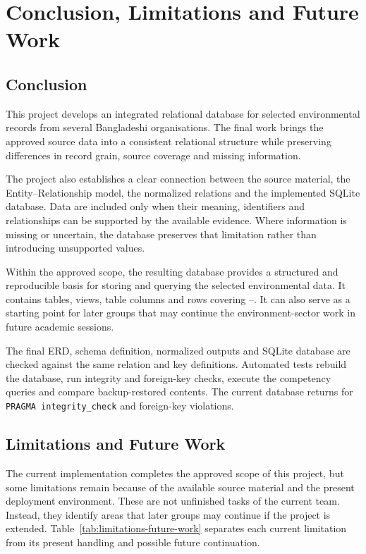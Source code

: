 \section{Conclusion, Limitations and Future Work}
\label{sec:cfw}

\subsection{Conclusion}

This project develops an integrated relational database for selected
environmental records from several Bangladeshi organisations. The final work
brings the approved source data into a consistent relational structure while
preserving differences in record grain, source coverage and missing
information.

The project also establishes a clear connection between the source material,
the Entity--Relationship model, the normalized relations and the implemented
SQLite database. Data are included only when their meaning, identifiers and
relationships can be supported by the available evidence. Where information
is missing or uncertain, the database preserves that limitation rather than
introducing unsupported values.

Within the approved scope, the resulting database provides a structured and
reproducible basis for storing and querying the selected environmental data.
It contains \mDbTables{} tables, \mDbViews{} views, \mDbColumns{} table columns
and \mDbRows{} rows covering \mYearMin--\mYearMax. It can also serve as a
starting point for later groups that may continue the environment-sector work
in future academic sessions.

The final ERD, schema definition, normalized outputs and SQLite database are
checked against the same relation and key definitions. Automated tests rebuild
the database, run integrity and foreign-key checks, execute the competency
queries and compare backup-restored contents. The current database returns
\texttt{\mDbIntegrity} for \texttt{PRAGMA integrity\_check} and
\mDbFkViolations{} foreign-key violations.

\subsection{Limitations and Future Work}
\label{subsec:future}

The current implementation completes the approved scope of this project, but
some limitations remain because of the available source material and the
present deployment environment. These are not unfinished tasks of the current
team. Instead, they identify areas that later groups may continue if the
project is extended. Table~\ref{tab:limitations-future-work} separates each
current limitation from its present handling and possible future continuation.

